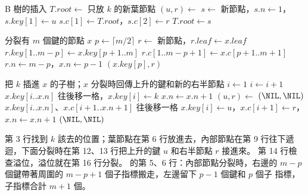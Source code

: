 \begin{pseudo}[label=alg:mw-insert]{B 樹的插入}
        \State $T.\mathit{root} \gets$ 只放 $k$ 的新葉節點
        \State \Return
    \EndIf
    \State $(u, r) \gets$ 
     
        \State $s \gets$ 新節點，$s.n \gets 1$，$s.\mathit{key}[1] \gets u$
        \State $s.c[1] \gets T.\mathit{root}$，$s.c[2] \gets r$
        \State $T.\mathit{root} \gets s$
    \EndIf
\EndProcedure
\end{pseudo}

\begin{pseudo}[label=alg:mw-split]{分裂有 $m$ 個鍵的節點 $x$}
    \State $p \gets \lceil m/2 \rceil$
    \State $r \gets$ 新節點，$r.\mathit{leaf} \gets x.\mathit{leaf}$
    \State $r.\mathit{key}[1..m-p] \gets x.\mathit{key}[p+1..m]$
        \State $r.c[1..m-p+1] \gets x.c[p+1..m+1]$
    \EndIf
    \State $r.n \gets m - p$，$x.n \gets p - 1$
    \State \Return $(x.\mathit{key}[p], r)$
\EndFunction
\end{pseudo}

\begin{pseudo}[label=alg:mw-insdown, unbreakable]{把 $k$ 插進 $x$ 的子樹；$x$ 分裂時回傳上升的鍵和新的右半節點}
    \State $i \gets 1$
        \State $i \gets i + 1$
    \EndWhile
        \State $x.\mathit{key}[i..x.n]$ 往後移一格，$x.\mathit{key}[i] \gets k$
        \State $x.n \gets x.n + 1$
    \Else
        \State $(u, r) \gets$ 
            \State \Return $(\NIL, \NIL)$
        \EndIf
        \State $x.\mathit{key}[i..x.n]$、$x.c[i+1..x.n+1]$ 往後移一格
        \State $x.\mathit{key}[i] \gets u$，$x.c[i+1] \gets r$，$x.n \gets x.n + 1$
    \EndIf
        \State \Return $(\NIL, \NIL)$
    \EndIf
    \State \Return {}
\EndFunction
\end{pseudo}

 第 3 行找到 $k$ 該去的位置；葉節點在第 6 行放進去，內部節點在第
9 行往下遞迴，下面分裂時在第 12、13 行把上升的鍵 $u$ 和右半節點 $r$ 接進來。 第 14
行檢查溢位，溢位就在第 16 行分裂。  的第 5、6 行：內部節點分裂時，右邊的 $m - p$
個鍵帶著周圍的 $m - p + 1$ 個子指標搬走，左邊留下 $p - 1$ 個鍵和 $p$ 個子
指標，子指標合計 $m + 1$ 個。


